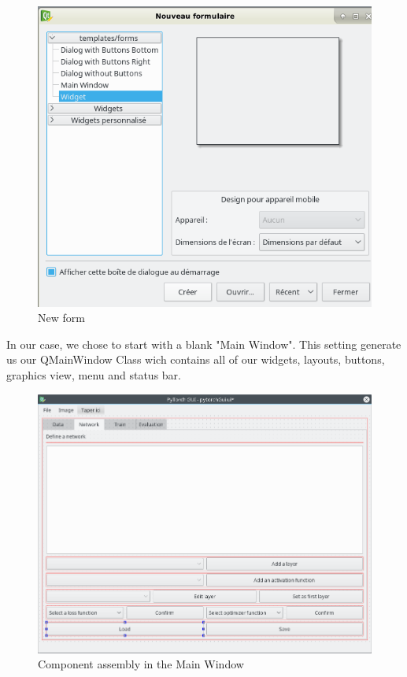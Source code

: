 \begin{figure}[h!]
    \centering 
    \includegraphics[scale=0.5]{figures/qt1.png}
    \caption{New form}
  \end{figure}

In our case, we chose to start with a blank "Main Window". This setting generate us our QMainWindow Class wich contains all of our widgets, layouts, buttons, graphics view, menu and status bar. 

\begin{figure}[h!]
    \centering 
    \includegraphics[scale=0.4]{figures/guirep.png}
    \caption{Component assembly in the Main Window}
  \end{figure}

